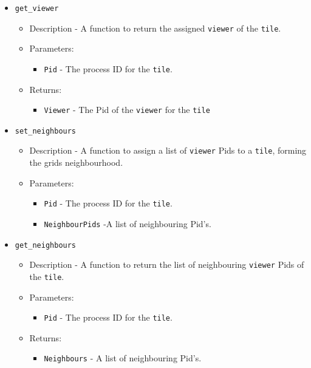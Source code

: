 \begin{itemize}
	\item {\tt get\_viewer}
		\begin{itemize}
			\item Description - A function to return the assigned \verb+viewer+ of the \verb+tile+.
			\item Parameters:
				\begin{itemize}
					\item {\tt Pid} - The process ID for the \verb+tile+.
				\end{itemize}
			\item Returns:
				\begin{itemize}
					\item {\tt Viewer} - The Pid of the \verb+viewer+ for the \verb+tile+
				\end{itemize}
		\end{itemize}

	\item {\tt set\_neighbours}
		\begin{itemize}
			\item Description - A function to assign a list of \verb+viewer+ Pids to a \verb+tile+, forming the grids neighbourhood.
			\item Parameters:
				\begin{itemize}
					\item {\tt Pid} - The process ID for the \verb+tile+.
					\item {\tt NeighbourPids} -A list of neighbouring Pid's.
				\end{itemize}
		\end{itemize}	

	\item {\tt get\_neighbours}
		\begin{itemize}
			\item Description - A function to return the list of neighbouring \verb+viewer+ Pids of the \verb+tile+.
			\item Parameters:
				\begin{itemize}
					\item {\tt Pid} - The process ID for the \verb+tile+.
				\end{itemize}
			\item Returns:
				\begin{itemize}
					\item {\tt Neighbours} - A list of neighbouring Pid's.
				\end{itemize}
		\end{itemize}


\end{itemize}
